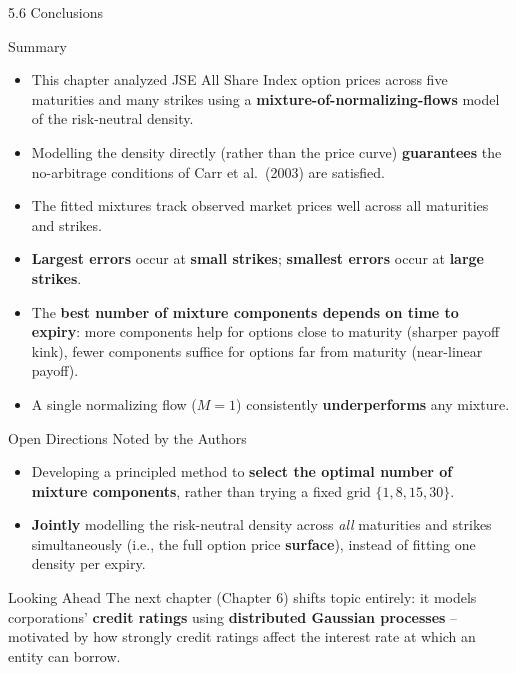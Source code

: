 \documentclass[aspectratio=169,10pt]{beamer}
\begin{document}
\begin{frame}[allowframebreaks]{5.6 Conclusions}

\begin{block}{Summary}
\begin{itemize}
  \item This chapter analyzed JSE All Share Index option prices across five
  maturities and many strikes using a \textbf{mixture-of-normalizing-flows}
  model of the risk-neutral density.
  \item Modelling the density directly (rather than the price curve)
  \textbf{guarantees} the no-arbitrage conditions of Carr et al.\ (2003)
  are satisfied.
  \item The fitted mixtures track observed market prices well across all
  maturities and strikes.
  \item \textbf{Largest errors} occur at \textbf{small strikes}; \textbf{smallest
  errors} occur at \textbf{large strikes}.
  \item The \textbf{best number of mixture components depends on time to
  expiry}: more components help for options close to maturity (sharper
  payoff kink), fewer components suffice for options far from maturity
  (near-linear payoff).
  \item A single normalizing flow ($M=1$) consistently \textbf{underperforms}
  any mixture.
\end{itemize}
\end{block}

\begin{block}{Open Directions Noted by the Authors}
\begin{itemize}
  \item Developing a principled method to \textbf{select the optimal number
  of mixture components}, rather than trying a fixed grid $\{1,8,15,30\}$.
  \item \textbf{Jointly} modelling the risk-neutral density across \emph{all}
  maturities and strikes simultaneously (i.e., the full option price
  \textbf{surface}), instead of fitting one density per expiry.
\end{itemize}
\end{block}

\begin{alertblock}{Looking Ahead}
The next chapter (Chapter 6) shifts topic entirely: it models corporations'
\textbf{credit ratings} using \textbf{distributed Gaussian processes} --
motivated by how strongly credit ratings affect the interest rate at which
an entity can borrow.
\end{alertblock}

\end{frame}
\end{document}
